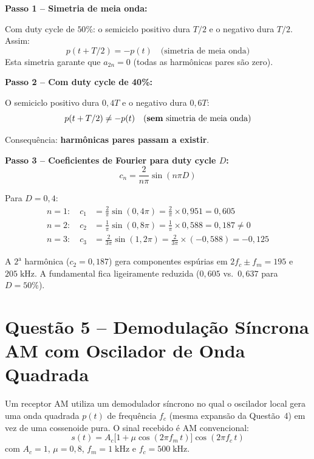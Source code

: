 \documentclass[11pt,a4paper]{article}
\begin{document}
\begin{resolucao}

\textbf{Passo 1 -- Simetria de meia onda:}

Com duty cycle de $50\%$: o semiciclo positivo dura $T/2$ e o negativo dura $T/2$. Assim:
\[
  p(t + T/2) = -p(t) \quad \text{(simetria de meia onda)}
\]
Esta simetria garante que $a_{2n} = 0$ (todas as harmônicas pares são zero).

\textbf{Passo 2 -- Com duty cycle de 40\%:}

O semiciclo positivo dura $0{,}4T$ e o negativo dura $0{,}6T$:
\[
  p(t + T/2) \neq -p(t) \quad \text{(\textbf{sem} simetria de meia onda)}
\]

Consequência: \textbf{harmônicas pares passam a existir}.

\textbf{Passo 3 -- Coeficientes de Fourier para duty cycle $D$:}
\[
  c_n = \frac{2}{n\pi}\sin(n\pi D)
\]

Para $D = 0{,}4$:
\begin{align*}
  n = 1: \quad c_1 &= \frac{2}{\pi}\sin(0{,}4\pi) = \frac{2}{\pi} \times 0{,}951 = 0{,}605 \\[4pt]
  n = 2: \quad c_2 &= \frac{1}{\pi}\sin(0{,}8\pi) = \frac{1}{\pi} \times 0{,}588 = \boxed{0{,}187 \neq 0} \\[4pt]
  n = 3: \quad c_3 &= \frac{2}{3\pi}\sin(1{,}2\pi) = \frac{2}{3\pi} \times (-0{,}588) = -0{,}125
\end{align*}

A $2^{\text{a}}$ harmônica ($c_2 = 0{,}187$) gera componentes espúrias em $2f_c \pm f_m = 195$ e $205\;\text{kHz}$. A fundamental fica ligeiramente reduzida ($0{,}605$ vs.\ $0{,}637$ para $D = 50\%$).
\end{resolucao}


\section*{Questão 5 -- Demodulação Síncrona AM com Oscilador de Onda Quadrada}

Um receptor AM utiliza um demodulador síncrono no qual o oscilador local gera uma onda quadrada $p(t)$ de frequência $f_c$ (mesma expansão da Questão~4) em vez de uma cossenoide pura. O sinal recebido é AM convencional:
\[
  s(t) = A_c\big[1 + \mu\cos(2\pi f_m\, t)\big]\cos(2\pi f_c\, t)
\]
com $A_c = 1$, $\mu = 0{,}8$, $f_m = 1\;\text{kHz}$ e $f_c = 500\;\text{kHz}$.
\end{document}
